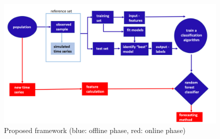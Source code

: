 \documentclass[11pt,a4paper,]{article}
\theoremstyle{definition}
\theoremstyle{definition}
\theoremstyle{definition}
\theoremstyle{remark}
\begin{document}
\begin{figure}

{\centering \includegraphics[width=\textwidth]{figures/framework} 

}

\caption{Proposed framework (blue: offline phase, red: online phase)}\label{fig:framework}
\end{figure}
\end{document}
